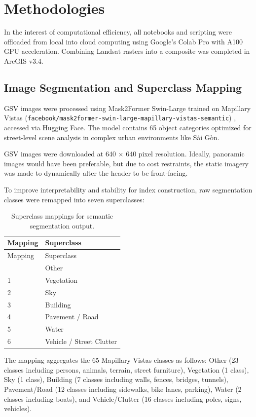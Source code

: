 \documentclass[
]{article}
\begin{document}
\section{Methodologies}
\label{sec:methods}

In the interest of computational efficiency, all notebooks and scripting were offloaded from local into cloud computing using Google's Colab Pro with A100 GPU acceleration. Combining Landsat rasters into a composite was completed in ArcGIS v3.4.

\subsection{Image Segmentation and Superclass Mapping}
\label{subsec:segmentation}

GSV images were processed using Mask2Former Swin-Large \citep{cheng2022} trained on Mapillary Vistas (\texttt{facebook/mask2former-swin-large-mapillary-vistas-semantic}) \citep{neuhold2017}, accessed via Hugging Face. The model contains 65 object categories optimized for street-level scene analysis in complex urban environments like Sài Gòn.

GSV images were downloaded at 640 × 640 pixel resolution. Ideally, panoramic images would have been preferable, but due to cost restraints, the static imagery was made to dynamically alter the header to be front-facing.

To improve interpretability and stability for index construction, raw segmentation classes were remapped into seven superclasses:

\begin{longtable}[]{@{}ll@{}}
\caption{Superclass mappings for semantic segmentation output.}\label{tab:superclass}\\
\toprule\noalign{}
Mapping & Superclass \\
\midrule\noalign{}
\endfirsthead
\toprule\noalign{}
Mapping & Superclass \\
\midrule\noalign{}
\endhead
\bottomrule\noalign{}
\endlastfoot
0 & Other \\
1 & Vegetation \\
2 & Sky \\
3 & Building \\
4 & Pavement / Road \\
5 & Water \\
6 & Vehicle / Street Clutter \\
\end{longtable}

The mapping aggregates the 65 Mapillary Vistas classes as follows: Other (23 classes including persons, animals, terrain, street furniture), Vegetation (1 class), Sky (1 class), Building (7 classes including walls, fences, bridges, tunnels), Pavement/Road (12 classes including sidewalks, bike lanes, parking), Water (2 classes including boats), and Vehicle/Clutter (16 classes including poles, signs, vehicles).
\end{document}
